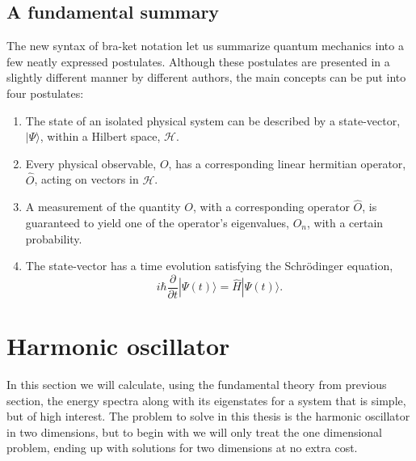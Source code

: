 \subsection{A fundamental summary}
The new syntax of bra-ket notation let us summarize quantum mechanics into a
few neatly expressed postulates. 
Although these postulates are presented in a slightly different manner by
different authors, the main concepts can be put into four postulates:
\begin{enumerate}[{Postulate} 1: ]
\item The state of an isolated physical system can be described by a
state-vector, $|\Psi \rangle$,  within
a Hilbert space, $\mathcal{H}$.
\item Every physical observable, $O$, has a corresponding linear hermitian
operator, $\hat{O}$, acting on vectors in $\mathcal{H}$.
\item A measurement of the quantity $O$, with a corresponding operator
$\hat{O}$, is guaranteed to yield one of the operator's eigenvalues, $O_n$, with a
certain probability.
\item The state-vector has a time evolution satisfying the Schrödinger
equation,
\begin{equation}
\label{eq:qm:schrodingerbraket}
i\hbar \frac{\partial}{\partial t} | \Psi(t) \rangle =
\hat{H} | \Psi(t) \rangle .
\end{equation}
\end{enumerate}



\section{Harmonic oscillator}
\label{sec:qm:ho}
In this section we will calculate, using the fundamental theory from previous section, the energy spectra along with its eigenstates for a system that is simple, but of high interest.
The problem to solve in this thesis is the harmonic oscillator in two dimensions, but
to begin with we will only treat the one dimensional problem, ending up with
solutions for two dimensions at no extra cost.

